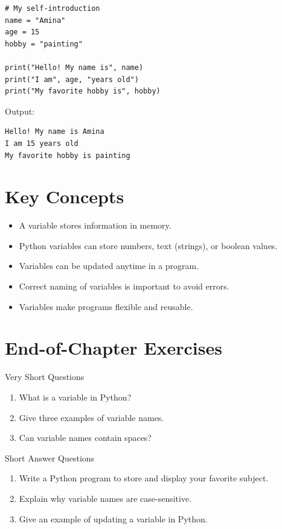 \begin{verbatim}
# My self-introduction
name = "Amina"
age = 15
hobby = "painting"

print("Hello! My name is", name)
print("I am", age, "years old")
print("My favorite hobby is", hobby)
\end{verbatim}

Output:

\begin{verbatim}
Hello! My name is Amina
I am 15 years old
My favorite hobby is painting
\end{verbatim}

\section{Key Concepts}

\begin{itemize}
    \item A variable stores information in memory.
    \item Python variables can store numbers, text (strings), or boolean values.
    \item Variables can be updated anytime in a program.
    \item Correct naming of variables is important to avoid errors.
    \item Variables make programs flexible and reusable.
\end{itemize}

\section{End-of-Chapter Exercises}

\begin{exercise}{Very Short Questions}
\begin{enumerate}
    \item What is a variable in Python?
    \item Give three examples of variable names.
    \item Can variable names contain spaces?
\end{enumerate}
\end{exercise}

\begin{exercise}{Short Answer Questions}
\begin{enumerate}
    \item Write a Python program to store and display your favorite subject.
    \item Explain why variable names are case-sensitive.
    \item Give an example of updating a variable in Python.
\end{enumerate}
\end{exercise}

